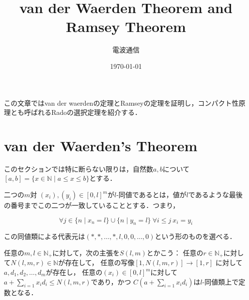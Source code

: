 \documentclass[leqno, 12pt]{jsarticle}
\title{van der Waerden Theorem and Ramsey Theorem}
\author{電波通信}
\date{\today}
\newcommand{\nn}{\mathbb{N}}
\begin{document}
\maketitle

この文章ではvan der waerdenの定理とRamseyの定理を証明し，コンパクト性原理とも呼ばれるRadoの選択定理を紹介する．
\section{van der Waerden's Theorem}
このセクションでは特に断らない限りは，自然数$a, b$について$[a, b]=\{x\in \nn\mid a\le x\le b\}$とする．

二つの$m$対
$(x_i), ( y_i)\in [0, l]^m$が$l$-同値であるとは，値が$l$であるような最後の番号までこの二つが一致していることとする．つまり，

\[
\forall j\in \{n\mid x_n=l\}\cup \{n\mid y_n=l\}\ \forall i\le j\ x_i=y_i
\]

この同値類による代表元は$(*, *, \dots, *,  l, 0,0, \dots, 0)$という形のものを選べる．

任意の$m, l\in \nn_{+}$に対して，次の主張を$S(l, m)$とかこう：
任意の$r\in \nn_{+}$に対して$N(l, m, r)\in \nn$が存在して，
任意の写像$[1, N(l, m, r)]\to [1, r]$
に対して$a, d_1, d_2, \dots, d_m$が存在し，
任意の$(x_i)\in [0, l]^m$に対して
$a+\sum_{i=1}x_id_i\le N(l, m, r)$であり，かつ
$C(a+\sum_{i=1}x_id_i)$は$l$-同値類上で定数となる．
\end{document}
